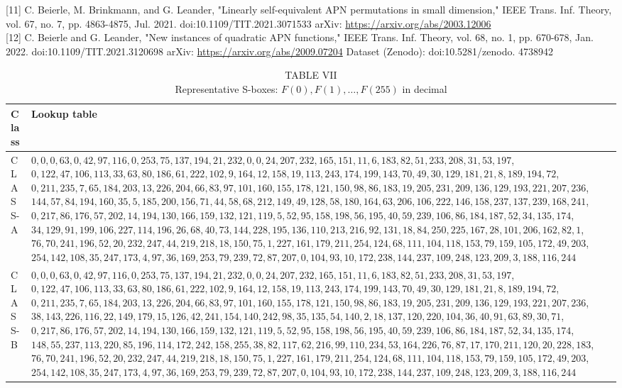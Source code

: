 \documentclass[10pt]{article}
\begin{document}
[11] C. Beierle, M. Brinkmann, and G. Leander, "Linearly self-equivalent APN permutations in small dimension," IEEE Trans. Inf. Theory, vol. 67, no. 7, pp. 4863-4875, Jul. 2021. doi:10.1109/TIT.2021.3071533 arXiv: \href{https://arxiv.org/abs/2003.12006}{https://arxiv.org/abs/2003.12006}\\[0pt]
[12] C. Beierle and G. Leander, "New instances of quadratic APN functions," IEEE Trans. Inf. Theory, vol. 68, no. 1, pp. 670-678, Jan. 2022. doi:10.1109/TIT.2021.3120698 arXiv: \href{https://arxiv.org/abs/2009.07204}{https://arxiv.org/abs/2009.07204} Dataset (Zenodo): doi:10.5281/zenodo. 4738942

\begin{table}[h]
\begin{center}
\captionsetup{labelformat=empty}
\caption{TABLE VII\\
Representative S-boxes: $F(0), F(1), \ldots, F(255)$ in decimal}
\begin{tabular}{|l|l|}
\hline
Class & Lookup table \\
\hline
CLASS-A & $0,0,0,63,0,42,97,116,0,253,75,137,194,21,232,0,0,24,207,232,165,151,11,6,183,82,51,233,208,31,53,197$, $0,122,47,106,113,33,63,80,186,61,222,102,9,164,12,158,19,113,243,174,199,143,70,49,30,129,181,21,8,189,194,72$, $0,211,235,7,65,184,203,13,226,204,66,83,97,101,160,155,178,121,150,98,86,183,19,205,231,209,136,129,193,221,207,236$, $144,57,84,194,160,35,5,185,200,156,71,44,58,68,212,149,49,128,58,180,164,63,206,106,222,146,158,237,137,239,168,241$, $0,217,86,176,57,202,14,194,130,166,159,132,121,119,5,52,95,158,198,56,195,40,59,239,106,86,184,187,52,34,135,174$, $34,129,91,199,106,227,114,196,26,68,40,73,144,228,195,136,110,213,216,92,131,18,84,250,225,167,28,101,206,162,82,1$, $76,70,241,196,52,20,232,247,44,219,218,18,150,75,1,227,161,179,211,254,124,68,111,104,118,153,79,159,105,172,49,203$, $254,142,108,35,247,173,4,97,36,169,253,79,239,72,87,207,0,104,93,10,172,238,144,237,109,248,123,209,3,188,116,244$ \\
\hline
CLASS-B & $0,0,0,63,0,42,97,116,0,253,75,137,194,21,232,0,0,24,207,232,165,151,11,6,183,82,51,233,208,31,53,197$, $0,122,47,106,113,33,63,80,186,61,222,102,9,164,12,158,19,113,243,174,199,143,70,49,30,129,181,21,8,189,194,72$, $0,211,235,7,65,184,203,13,226,204,66,83,97,101,160,155,178,121,150,98,86,183,19,205,231,209,136,129,193,221,207,236$, $38,143,226,116,22,149,179,15,126,42,241,154,140,242,98,35,135,54,140,2,18,137,120,220,104,36,40,91,63,89,30,71$, $0,217,86,176,57,202,14,194,130,166,159,132,121,119,5,52,95,158,198,56,195,40,59,239,106,86,184,187,52,34,135,174$, $148,55,237,113,220,85,196,114,172,242,158,255,38,82,117,62,216,99,110,234,53,164,226,76,87,17,170,211,120,20,228,183$, $76,70,241,196,52,20,232,247,44,219,218,18,150,75,1,227,161,179,211,254,124,68,111,104,118,153,79,159,105,172,49,203$, $254,142,108,35,247,173,4,97,36,169,253,79,239,72,87,207,0,104,93,10,172,238,144,237,109,248,123,209,3,188,116,244$ \\

\end{tabular}
\end{center}
\end{table}
\end{document}
